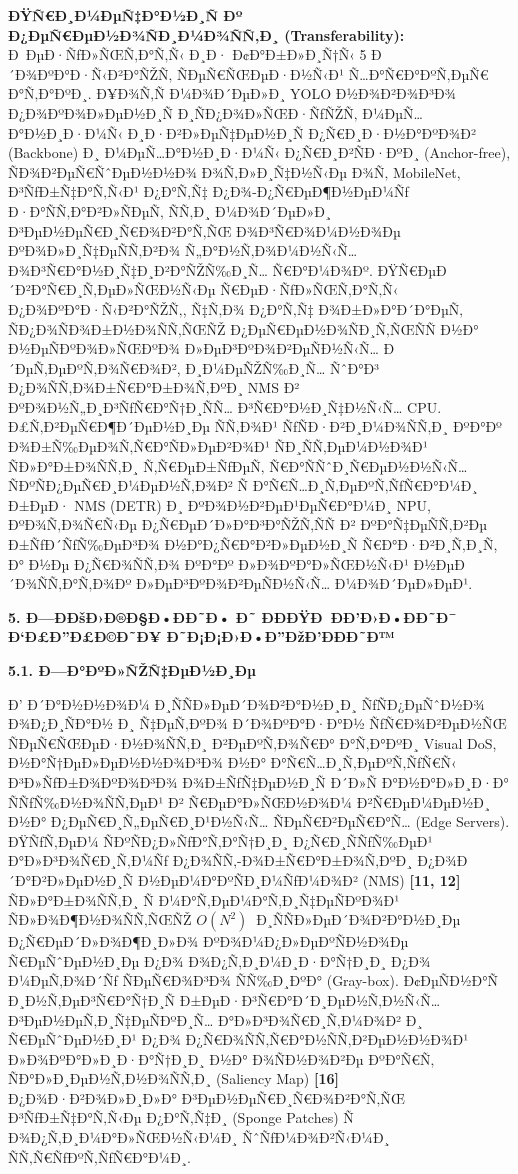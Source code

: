 \documentclass[]{article}
\begin{document}
\textbf{ÐŸÑ€Ð¸Ð¼ÐµÑ‡Ð°Ð½Ð¸Ñ Ðº Ð¿ÐµÑ€ÐµÐ½Ð¾ÑÐ¸Ð¼Ð¾ÑÑ‚Ð¸ (Transferability):} Ð ÐµÐ·ÑƒÐ»ÑŒÑ‚Ð°Ñ‚Ñ‹ Ð¸Ð· Ð¢Ð°Ð±Ð»Ð¸Ñ†Ñ‹ 5 Ð´Ð¾ÐºÐ°Ð·Ñ‹Ð²Ð°ÑŽÑ‚ ÑÐµÑ€ÑŒÐµÐ·Ð½Ñ‹Ð¹ Ñ…Ð°Ñ€Ð°ÐºÑ‚ÐµÑ€ Ð°Ñ‚Ð°ÐºÐ¸. Ð¥Ð¾Ñ‚Ñ Ð¼Ð¾Ð´ÐµÐ»Ð¸ YOLO Ð½Ð¾Ð²Ð¾Ð³Ð¾ Ð¿Ð¾ÐºÐ¾Ð»ÐµÐ½Ð¸Ñ Ð¸ÑÐ¿Ð¾Ð»ÑŒÐ·ÑƒÑŽÑ‚ Ð¼ÐµÑ…Ð°Ð½Ð¸Ð·Ð¼Ñ‹ Ð¸Ð·Ð²Ð»ÐµÑ‡ÐµÐ½Ð¸Ñ Ð¿Ñ€Ð¸Ð·Ð½Ð°ÐºÐ¾Ð² (Backbone) Ð¸ Ð¼ÐµÑ…Ð°Ð½Ð¸Ð·Ð¼Ñ‹ Ð¿Ñ€Ð¸Ð²ÑÐ·ÐºÐ¸ (Anchor-free), ÑÐ¾Ð²ÐµÑ€ÑˆÐµÐ½Ð½Ð¾ Ð¾Ñ‚Ð»Ð¸Ñ‡Ð½Ñ‹Ðµ Ð¾Ñ‚ MobileNet, Ð³ÑƒÐ±Ñ‡Ð°Ñ‚Ñ‹Ð¹ Ð¿Ð°Ñ‚Ñ‡ Ð¿Ð¾-Ð¿Ñ€ÐµÐ¶Ð½ÐµÐ¼Ñƒ Ð·Ð°ÑÑ‚Ð°Ð²Ð»ÑÐµÑ‚ ÑÑ‚Ð¸ Ð¼Ð¾Ð´ÐµÐ»Ð¸ Ð³ÐµÐ½ÐµÑ€Ð¸Ñ€Ð¾Ð²Ð°Ñ‚ÑŒ Ð¾Ð³Ñ€Ð¾Ð¼Ð½Ð¾Ðµ ÐºÐ¾Ð»Ð¸Ñ‡ÐµÑÑ‚Ð²Ð¾ Ñ„Ð°Ð½Ñ‚Ð¾Ð¼Ð½Ñ‹Ñ… Ð¾Ð³Ñ€Ð°Ð½Ð¸Ñ‡Ð¸Ð²Ð°ÑŽÑ‰Ð¸Ñ… Ñ€Ð°Ð¼Ð¾Ðº. ÐŸÑ€ÐµÐ´Ð²Ð°Ñ€Ð¸Ñ‚ÐµÐ»ÑŒÐ½Ñ‹Ðµ Ñ€ÐµÐ·ÑƒÐ»ÑŒÑ‚Ð°Ñ‚Ñ‹ Ð¿Ð¾ÐºÐ°Ð·Ñ‹Ð²Ð°ÑŽÑ‚, Ñ‡Ñ‚Ð¾ Ð¿Ð°Ñ‚Ñ‡ Ð¾Ð±Ð»Ð°Ð´Ð°ÐµÑ‚ ÑÐ¿Ð¾ÑÐ¾Ð±Ð½Ð¾ÑÑ‚ÑŒÑŽ Ð¿ÐµÑ€ÐµÐ½Ð¾ÑÐ¸Ñ‚ÑŒÑÑ Ð½Ð° Ð½ÐµÑÐºÐ¾Ð»ÑŒÐºÐ¾ Ð»ÐµÐ³ÐºÐ¾Ð²ÐµÑÐ½Ñ‹Ñ… Ð´ÐµÑ‚ÐµÐºÑ‚Ð¾Ñ€Ð¾Ð², Ð¸Ð¼ÐµÑŽÑ‰Ð¸Ñ… ÑˆÐ°Ð³ Ð¿Ð¾ÑÑ‚Ð¾Ð±Ñ€Ð°Ð±Ð¾Ñ‚ÐºÐ¸ NMS Ð² ÐºÐ¾Ð½Ñ„Ð¸Ð³ÑƒÑ€Ð°Ñ†Ð¸ÑÑ… Ð³Ñ€Ð°Ð½Ð¸Ñ‡Ð½Ñ‹Ñ… CPU. Ð£Ñ‚Ð²ÐµÑ€Ð¶Ð´ÐµÐ½Ð¸Ðµ ÑÑ‚Ð¾Ð¹ ÑƒÑÐ·Ð²Ð¸Ð¼Ð¾ÑÑ‚Ð¸ ÐºÐ°Ðº Ð¾Ð±Ñ‰ÐµÐ¾Ñ‚Ñ€Ð°ÑÐ»ÐµÐ²Ð¾Ð¹ ÑÐ¸ÑÑ‚ÐµÐ¼Ð½Ð¾Ð¹ ÑÐ»Ð°Ð±Ð¾ÑÑ‚Ð¸ Ñ‚Ñ€ÐµÐ±ÑƒÐµÑ‚ Ñ€Ð°ÑÑˆÐ¸Ñ€ÐµÐ½Ð½Ñ‹Ñ… ÑÐºÑÐ¿ÐµÑ€Ð¸Ð¼ÐµÐ½Ñ‚Ð¾Ð² Ñ Ð°Ñ€Ñ…Ð¸Ñ‚ÐµÐºÑ‚ÑƒÑ€Ð°Ð¼Ð¸ Ð±ÐµÐ· NMS (DETR) Ð¸ ÐºÐ¾Ð½Ð²ÐµÐ¹ÐµÑ€Ð°Ð¼Ð¸ NPU, ÐºÐ¾Ñ‚Ð¾Ñ€Ñ‹Ðµ Ð¿Ñ€ÐµÐ´Ð»Ð°Ð³Ð°ÑŽÑ‚ÑÑ Ð² ÐºÐ°Ñ‡ÐµÑÑ‚Ð²Ðµ Ð±ÑƒÐ´ÑƒÑ‰ÐµÐ³Ð¾ Ð½Ð°Ð¿Ñ€Ð°Ð²Ð»ÐµÐ½Ð¸Ñ Ñ€Ð°Ð·Ð²Ð¸Ñ‚Ð¸Ñ, Ð° Ð½Ðµ Ð¿Ñ€Ð¾ÑÑ‚Ð¾ ÐºÐ°Ðº Ð»Ð¾ÐºÐ°Ð»ÑŒÐ½Ñ‹Ð¹ Ð½ÐµÐ´Ð¾ÑÑ‚Ð°Ñ‚Ð¾Ðº Ð»ÐµÐ³ÐºÐ¾Ð²ÐµÑÐ½Ñ‹Ñ… Ð¼Ð¾Ð´ÐµÐ»ÐµÐ¹.

\textbf{5. Ð—ÐÐšÐ›Ð®Ð§Ð•ÐÐ˜Ð• Ð˜ ÐÐÐŸÐ ÐÐ’Ð›Ð•ÐÐ˜Ð¯ Ð‘Ð£Ð”Ð£Ð©Ð˜Ð¥ Ð˜Ð¡Ð¡Ð›Ð•Ð”ÐžÐ’ÐÐÐ˜Ð™}

\textbf{5.1. Ð—Ð°ÐºÐ»ÑŽÑ‡ÐµÐ½Ð¸Ðµ}

Ð’ Ð´Ð°Ð½Ð½Ð¾Ð¼ Ð¸ÑÑÐ»ÐµÐ´Ð¾Ð²Ð°Ð½Ð¸Ð¸ ÑƒÑÐ¿ÐµÑˆÐ½Ð¾ Ð¾Ð¿Ð¸ÑÐ°Ð½ Ð¸ Ñ‡ÐµÑ‚ÐºÐ¾ Ð´Ð¾ÐºÐ°Ð·Ð°Ð½ ÑƒÑ€Ð¾Ð²ÐµÐ½ÑŒ ÑÐµÑ€ÑŒÐµÐ·Ð½Ð¾ÑÑ‚Ð¸ Ð²ÐµÐºÑ‚Ð¾Ñ€Ð° Ð°Ñ‚Ð°ÐºÐ¸ Visual DoS, Ð½Ð°Ñ†ÐµÐ»ÐµÐ½Ð½Ð¾Ð³Ð¾ Ð½Ð° Ð°Ñ€Ñ…Ð¸Ñ‚ÐµÐºÑ‚ÑƒÑ€Ñ‹ Ð³Ð»ÑƒÐ±Ð¾ÐºÐ¾Ð³Ð¾ Ð¾Ð±ÑƒÑ‡ÐµÐ½Ð¸Ñ Ð´Ð»Ñ Ð°Ð½Ð°Ð»Ð¸Ð·Ð° ÑÑƒÑ‰Ð½Ð¾ÑÑ‚ÐµÐ¹ Ð² Ñ€ÐµÐ°Ð»ÑŒÐ½Ð¾Ð¼ Ð²Ñ€ÐµÐ¼ÐµÐ½Ð¸ Ð½Ð° Ð¿ÐµÑ€Ð¸Ñ„ÐµÑ€Ð¸Ð¹Ð½Ñ‹Ñ… ÑÐµÑ€Ð²ÐµÑ€Ð°Ñ… (Edge Servers). ÐŸÑƒÑ‚ÐµÐ¼ ÑÐºÑÐ¿Ð»ÑƒÐ°Ñ‚Ð°Ñ†Ð¸Ð¸ Ð¿Ñ€Ð¸ÑÑƒÑ‰ÐµÐ¹ Ð°Ð»Ð³Ð¾Ñ€Ð¸Ñ‚Ð¼Ñƒ Ð¿Ð¾ÑÑ‚-Ð¾Ð±Ñ€Ð°Ð±Ð¾Ñ‚ÐºÐ¸ Ð¿Ð¾Ð´Ð°Ð²Ð»ÐµÐ½Ð¸Ñ Ð½ÐµÐ¼Ð°ÐºÑÐ¸Ð¼ÑƒÐ¼Ð¾Ð² (NMS) \textbf{{[}11, 12{]}} ÑÐ»Ð°Ð±Ð¾ÑÑ‚Ð¸ Ñ Ð¼Ð°Ñ‚ÐµÐ¼Ð°Ñ‚Ð¸Ñ‡ÐµÑÐºÐ¾Ð¹ ÑÐ»Ð¾Ð¶Ð½Ð¾ÑÑ‚ÑŒÑŽ \(O\left( N^{2} \right)\ \) Ð¸ÑÑÐ»ÐµÐ´Ð¾Ð²Ð°Ð½Ð¸Ðµ Ð¿Ñ€ÐµÐ´Ð»Ð¾Ð¶Ð¸Ð»Ð¾ ÐºÐ¾Ð¼Ð¿Ð»ÐµÐºÑÐ½Ð¾Ðµ Ñ€ÐµÑˆÐµÐ½Ð¸Ðµ Ð¿Ð¾ Ð¾Ð¿Ñ‚Ð¸Ð¼Ð¸Ð·Ð°Ñ†Ð¸Ð¸ Ð¿Ð¾ Ð¼ÐµÑ‚Ð¾Ð´Ñƒ ÑÐµÑ€Ð¾Ð³Ð¾ ÑÑ‰Ð¸ÐºÐ° (Gray-box). Ð¢ÐµÑÐ½Ð°Ñ Ð¸Ð½Ñ‚ÐµÐ³Ñ€Ð°Ñ†Ð¸Ñ Ð±ÐµÐ·Ð³Ñ€Ð°Ð´Ð¸ÐµÐ½Ñ‚Ð½Ñ‹Ñ… Ð³ÐµÐ½ÐµÑ‚Ð¸Ñ‡ÐµÑÐºÐ¸Ñ… Ð°Ð»Ð³Ð¾Ñ€Ð¸Ñ‚Ð¼Ð¾Ð² Ð¸ Ñ€ÐµÑˆÐµÐ½Ð¸Ð¹ Ð¿Ð¾ Ð¿Ñ€Ð¾ÑÑ‚Ñ€Ð°Ð½ÑÑ‚Ð²ÐµÐ½Ð½Ð¾Ð¹ Ð»Ð¾ÐºÐ°Ð»Ð¸Ð·Ð°Ñ†Ð¸Ð¸ Ð½Ð° Ð¾ÑÐ½Ð¾Ð²Ðµ ÐºÐ°Ñ€Ñ‚ ÑÐ°Ð»Ð¸ÐµÐ½Ñ‚Ð½Ð¾ÑÑ‚Ð¸ (Saliency Map) \textbf{{[}16{]}} Ð¿Ð¾Ð·Ð²Ð¾Ð»Ð¸Ð»Ð° Ð³ÐµÐ½ÐµÑ€Ð¸Ñ€Ð¾Ð²Ð°Ñ‚ÑŒ Ð³ÑƒÐ±Ñ‡Ð°Ñ‚Ñ‹Ðµ Ð¿Ð°Ñ‚Ñ‡Ð¸ (Sponge Patches) Ñ Ð¾Ð¿Ñ‚Ð¸Ð¼Ð°Ð»ÑŒÐ½Ñ‹Ð¼Ð¸ ÑˆÑƒÐ¼Ð¾Ð²Ñ‹Ð¼Ð¸ ÑÑ‚Ñ€ÑƒÐºÑ‚ÑƒÑ€Ð°Ð¼Ð¸.
\end{document}
